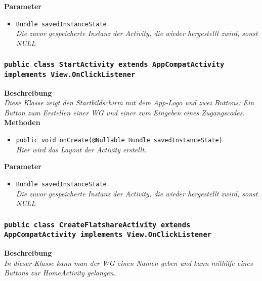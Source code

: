                 \textbf{Parameter}
                \begin{itemize}
        		\item\texttt{Bundle savedInstanceState}\\ 
                \textit{Die zuvor gespeicherte Instanz der Activity, die wieder hergestellt zwird, sonst NULL}\\
                \end{itemize}
                
        \subsubsection{\texttt{public class StartActivity extends AppCompatActivity implements View.OnClickListener}}
               
               	\textbf{Beschreibung} \\
      	        \textit{Diese Klasse zeigt den Startbildschirm mit dem App-Logo und zwei Buttons: Ein Button zum Erstellen einer WG und einer zum Eingeben eines Zugangscodes.} \\
                
                \textbf{Methoden}
                \begin{itemize}
        		\item\texttt{{public void onCreate(@Nullable Bundle savedInstanceState)}}\\
                \textit{Hier wird das Layout der Activity erstellt.}\\
                \end{itemize}
                
                \textbf{Parameter}
                \begin{itemize}
        		\item\texttt{Bundle savedInstanceState}\\ 
                \textit{Die zuvor gespeicherte Instanz der Activity, die wieder hergestellt zwird, sonst NULL}\\
                \end{itemize}       
                
        \subsubsection{\texttt{public class CreateFlatshareActivity extends AppCompatActivity implements View.OnClickListener}}
               
               	\textbf{Beschreibung} \\
      	        \textit{In dieser Klasse kann man der WG einen Namen geben und kann mithilfe eines Buttons zur HomeActivity gelangen.} \\
                

